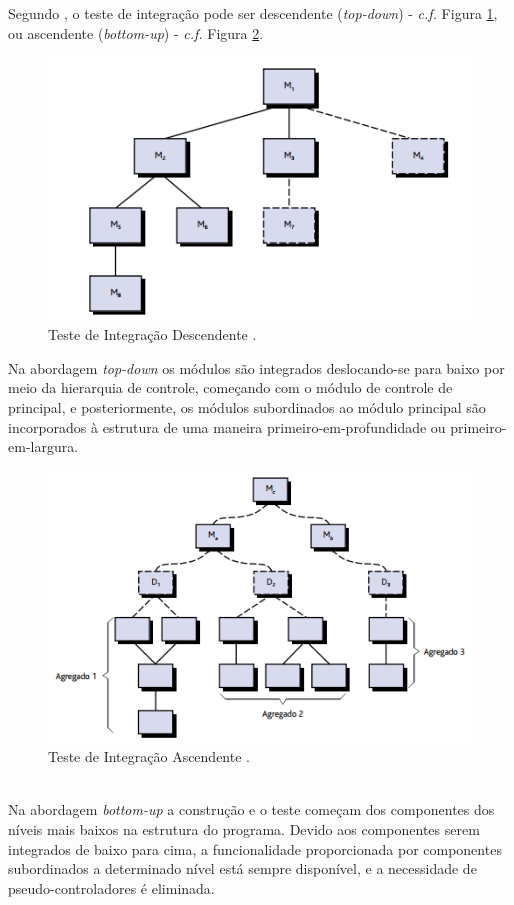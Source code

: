 \begin{itemize}
Segundo , o teste de integração pode ser descendente (\textit{top-down}) - \textit{c.f.} Figura \ref{figure:testedescendente}, ou ascendente (\textit{bottom-up}) - \textit{c.f.} Figura \ref{figure:testeascendente}. 

\begin{figure}[!htb]
\centering
\includegraphics[width=.5\textwidth]{images/testedescendente.png}
\caption{Teste de Integração Descendente \cite{PRESSMAN2016}.}
\label{figure:testedescendente}
\end{figure}

Na abordagem \textit{top-down} os módulos são integrados deslocando-se para baixo por meio da hierarquia de controle, começando com o módulo de controle de principal, e posteriormente, os módulos subordinados ao módulo principal são incorporados à estrutura de uma maneira primeiro-em-profundidade ou primeiro-em-largura.

\begin{figure}[!htb]
\centering
\includegraphics[width=.5\textwidth]{images/testeascendente.png}
\caption{Teste de Integração Ascendente \cite{PRESSMAN2016}.}
\label{figure:testeascendente}
\end{figure}\\

Na abordagem \textit{bottom-up} a construção e o teste começam dos componentes dos níveis mais baixos na estrutura do programa. Devido aos componentes serem integrados de baixo para cima, a funcionalidade proporcionada por componentes subordinados a determinado nível está sempre disponível, e a necessidade de pseudo-controladores é eliminada.


\end{itemize}
